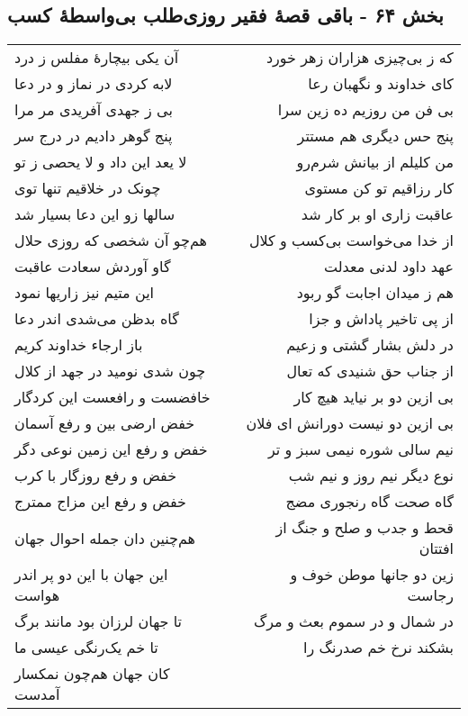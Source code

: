 \begin{center}
\section*{بخش ۶۴ - باقی قصهٔ فقیر روزی‌طلب بی‌واسطهٔ کسب}
\label{sec:sh064}
\begin{longtable}{l p{0.5cm} r}
آن یکی بیچارهٔ مفلس ز درد
&&
که ز بی‌چیزی هزاران زهر خورد
\\
لابه کردی در نماز و در دعا
&&
کای خداوند و نگهبان رعا
\\
بی ز جهدی آفریدی مر مرا
&&
بی فن من روزیم ده زین سرا
\\
پنج گوهر دادیم در درج سر
&&
پنج حس دیگری هم مستتر
\\
لا یعد این داد و لا یحصی ز تو
&&
من کلیلم از بیانش شرم‌رو
\\
چونک در خلاقیم تنها توی
&&
کار رزاقیم تو کن مستوی
\\
سالها زو این دعا بسیار شد
&&
عاقبت زاری او بر کار شد
\\
هم‌چو آن شخصی که روزی حلال
&&
از خدا می‌خواست بی‌کسب و کلال
\\
گاو آوردش سعادت عاقبت
&&
عهد داود لدنی معدلت
\\
این متیم نیز زاریها نمود
&&
هم ز میدان اجابت گو ربود
\\
گاه بدظن می‌شدی اندر دعا
&&
از پی تاخیر پاداش و جزا
\\
باز ارجاء خداوند کریم
&&
در دلش بشار گشتی و زعیم
\\
چون شدی نومید در جهد از کلال
&&
از جناب حق شنیدی که تعال
\\
خافضست و رافعست این کردگار
&&
بی ازین دو بر نیاید هیچ کار
\\
خفض ارضی بین و رفع آسمان
&&
بی ازین دو نیست دورانش ای فلان
\\
خفض و رفع این زمین نوعی دگر
&&
نیم سالی شوره نیمی سبز و تر
\\
خفض و رفع روزگار با کرب
&&
نوع دیگر نیم روز و نیم شب
\\
خفض و رفع این مزاج ممترج
&&
گاه صحت گاه رنجوری مضج
\\
هم‌چنین دان جمله احوال جهان
&&
قحط و جدب و صلح و جنگ از افتتان
\\
این جهان با این دو پر اندر هواست
&&
زین دو جانها موطن خوف و رجاست
\\
تا جهان لرزان بود مانند برگ
&&
در شمال و در سموم بعث و مرگ
\\
تا خم یک‌رنگی عیسی ما
&&
بشکند نرخ خم صدرنگ را
\\
کان جهان هم‌چون نمکسار آمدست
&&

\end{longtable}
\end{center}
